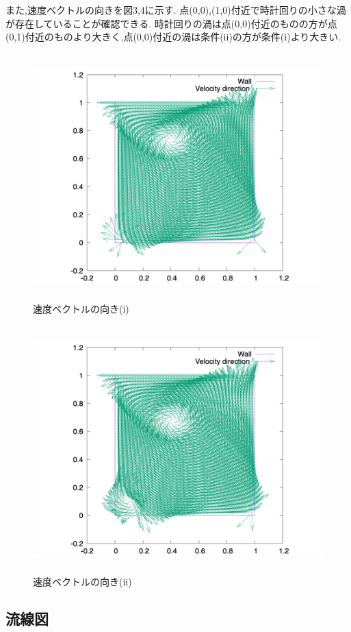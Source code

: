 \documentclass[upLaTeX,a4paper]{jsarticle}
\begin{document}
また,速度ベクトルの向きを図3,4に示す.
点(0,0),(1,0)付近で時計回りの小さな渦が存在していることが確認できる.
時計回りの渦は点(0,0)付近のものの方が点(0,1)付近のものより大きく,点(0,0)付近の渦は条件(ii)の方が条件(i)より大きい.

\begin{figure}[H]
  \centering
  \includegraphics[height=9.5cm]{outputs/img/velocity_abs_re50.png}
  \caption{速度ベクトルの向き(i)}
\end{figure}
\begin{figure}[H]
  \centering
  \includegraphics[height=9.5cm]{outputs/img/velocity_abs_re200.png}
  \caption{速度ベクトルの向き(ii)}
\end{figure}


\subsection{流線図}
\end{document}
